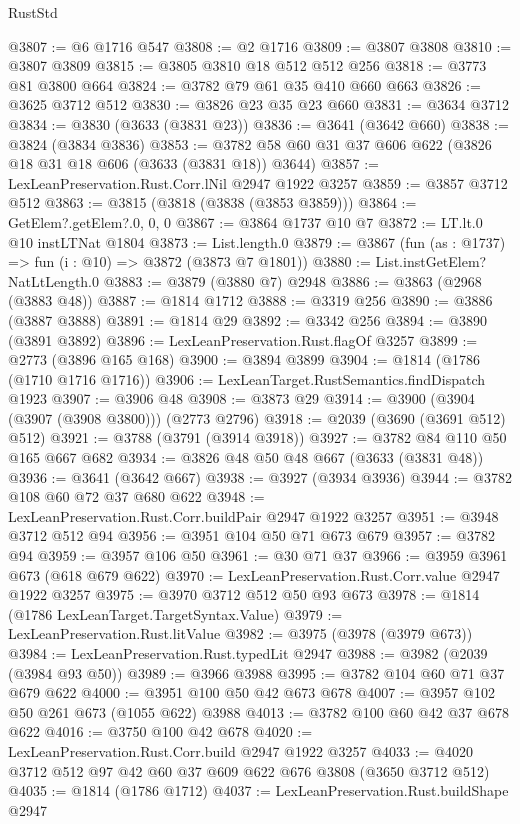 \begin{lexlean}{RustStd}
\begin{coremodule}
@3807 := @6 @1716 @547
@3808 := @2 @1716
@3809 := @3807 @3808
@3810 := @3807 @3809
@3815 := @3805 @3810 @18 @512 @512 @256
@3818 := @3773 @81 @3800 @664
@3824 := @3782 @79 @61 @35 @410 @660 @663
@3826 := @3625 @3712 @512
@3830 := @3826 @23 @35 @23 @660
@3831 := @3634 @3712
@3834 := @3830 (@3633 (@3831 @23))
@3836 := @3641 (@3642 @660)
@3838 := @3824 (@3834 @3836)
@3853 := @3782 @58 @60 @31 @37 @606 @622 (@3826 @18 @31 @18 @606 (@3633 (@3831 @18)) @3644)
@3857 := LexLeanPreservation.Rust.Corr.lNil @2947 @1922 @3257
@3859 := @3857 @3712 @512
@3863 := @3815 (@3818 (@3838 (@3853 @3859)))
@3864 := GetElem?.getElem?.{0, 0, 0}
@3867 := @3864 @1737 @10 @7
@3872 := LT.lt.{0} @10 instLTNat @1804
@3873 := List.length.{0}
@3879 := @3867 (fun (as : @1737) => fun (i : @10) => @3872 (@3873 @7 @1801))
@3880 := List.instGetElem?NatLtLength.{0}
@3883 := @3879 (@3880 @7) @2948
@3886 := @3863 (@2968 (@3883 @48))
@3887 := @1814 @1712
@3888 := @3319 @256
@3890 := @3886 (@3887 @3888)
@3891 := @1814 @29
@3892 := @3342 @256
@3894 := @3890 (@3891 @3892)
@3896 := LexLeanPreservation.Rust.flagOf @3257
@3899 := @2773 (@3896 @165 @168)
@3900 := @3894 @3899
@3904 := @1814 (@1786 (@1710 @1716 @1716))
@3906 := LexLeanTarget.RustSemantics.findDispatch @1923
@3907 := @3906 @48
@3908 := @3873 @29
@3914 := @3900 (@3904 (@3907 (@3908 @3800))) (@2773 @2796)
@3918 := @2039 (@3690 (@3691 @512) @512)
@3921 := @3788 (@3791 (@3914 @3918))
@3927 := @3782 @84 @110 @50 @165 @667 @682
@3934 := @3826 @48 @50 @48 @667 (@3633 (@3831 @48))
@3936 := @3641 (@3642 @667)
@3938 := @3927 (@3934 @3936)
@3944 := @3782 @108 @60 @72 @37 @680 @622
@3948 := LexLeanPreservation.Rust.Corr.buildPair @2947 @1922 @3257
@3951 := @3948 @3712 @512 @94
@3956 := @3951 @104 @50 @71 @673 @679
@3957 := @3782 @94
@3959 := @3957 @106 @50
@3961 := @30 @71 @37
@3966 := @3959 @3961 @673 (@618 @679 @622)
@3970 := LexLeanPreservation.Rust.Corr.value @2947 @1922 @3257
@3975 := @3970 @3712 @512 @50 @93 @673
@3978 := @1814 (@1786 LexLeanTarget.TargetSyntax.Value)
@3979 := LexLeanPreservation.Rust.litValue
@3982 := @3975 (@3978 (@3979 @673))
@3984 := LexLeanPreservation.Rust.typedLit @2947
@3988 := @3982 (@2039 (@3984 @93 @50))
@3989 := @3966 @3988
@3995 := @3782 @104 @60 @71 @37 @679 @622
@4000 := @3951 @100 @50 @42 @673 @678
@4007 := @3957 @102 @50 @261 @673 (@1055 @622) @3988
@4013 := @3782 @100 @60 @42 @37 @678 @622
@4016 := @3750 @100 @42 @678
@4020 := LexLeanPreservation.Rust.Corr.build @2947 @1922 @3257
@4033 := @4020 @3712 @512 @97 @42 @60 @37 @609 @622 @676 @3808 (@3650 @3712 @512)
@4035 := @1814 (@1786 @1712)
@4037 := LexLeanPreservation.Rust.buildShape @2947

\end{coremodule}
\end{lexlean}

